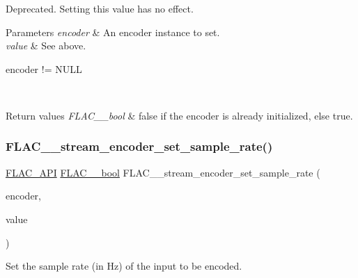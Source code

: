 Deprecated. Setting this value has no effect.

{} 
\begin{DoxyParams}{Parameters}
{\em encoder} & An encoder instance to set. \\
\hline
{\em value} & See above.  
\begin{DoxyCode}
encoder != NULL 
\end{DoxyCode}
 \\
\hline
\end{DoxyParams}

\begin{DoxyRetVals}{Return values}
{\em F\+L\+A\+C\+\_\+\+\_\+bool} & {\ttfamily false} if the encoder is already initialized, else {\ttfamily true}. \\
\hline
\end{DoxyRetVals}
\mbox{\label{group__flac__stream__encoder_ga108c3f4fbdcaa744ddbb125f91cb3838}} 
\subsubsection{\texorpdfstring{F\+L\+A\+C\+\_\+\+\_\+stream\+\_\+encoder\+\_\+set\+\_\+sample\+\_\+rate()}{FLAC\_\_stream\_encoder\_set\_sample\_rate()}}
{\footnotesize\ttfamily \hyperlink{group__flac__export_ga56ca07df8a23310707732b1c0007d6f5}{F\+L\+A\+C\+\_\+\+A\+PI} \hyperlink{ordinals_8h_a95103469f1cbd78b8cf250194985b34e}{F\+L\+A\+C\+\_\+\+\_\+bool} F\+L\+A\+C\+\_\+\+\_\+stream\+\_\+encoder\+\_\+set\+\_\+sample\+\_\+rate (\begin{DoxyParamCaption}\item[{\hyperlink{struct_f_l_a_c_____stream_encoder}{F\+L\+A\+C\+\_\+\+\_\+\+Stream\+Encoder} $\ast$}]{encoder,  }\item[{unsigned}]{value }\end{DoxyParamCaption})}

Set the sample rate (in Hz) of the input to be encoded.

